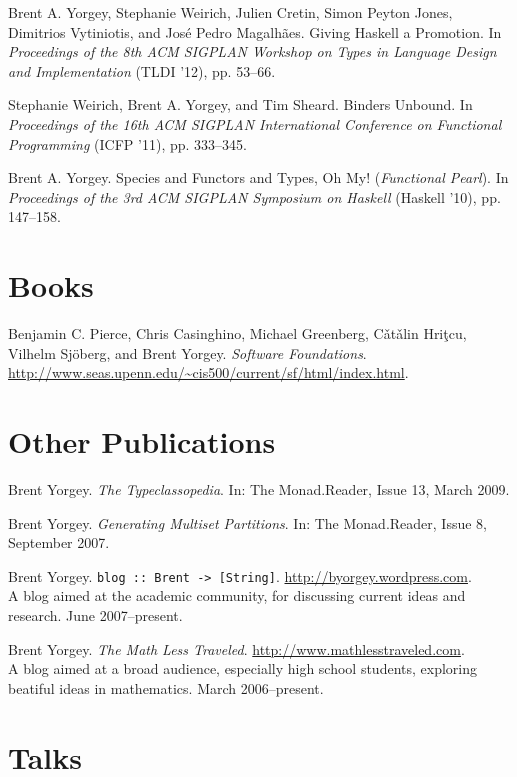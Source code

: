 \documentclass{article}
\newcommand{\cvitem}{\par\hangpara{2em}{1}}
\begin{document}
\cvitem Brent A. Yorgey, Stephanie Weirich, Julien Cretin, Simon
Peyton Jones, Dimitrios Vytiniotis, and Jos\'e Pedro
Magalh\~aes. Giving Haskell a Promotion. In \emph{Proceedings of the
  8th ACM SIGPLAN Workshop on Types in Language Design and
  Implementation} (TLDI '12), pp. 53--66.

\cvitem Stephanie Weirich, Brent A. Yorgey, and Tim Sheard. Binders
  Unbound. In \emph{Proceedings of the 16th ACM SIGPLAN International
    Conference on Functional Programming} (ICFP '11), pp. 333--345.

\cvitem Brent A. Yorgey. Species and Functors and Types, Oh
  My! (\emph{Functional Pearl}). In \emph{Proceedings of the 3rd ACM SIGPLAN
  Symposium on Haskell} (Haskell '10), pp. 147--158.

\section*{Books}
\cvitem Benjamin C. Pierce, Chris Casinghino, Michael Greenberg,
C{\v a}t{\v a}lin Hri{\c t}cu, Vilhelm Sj\"oberg, and Brent Yorgey. \emph{Software
  Foundations}. \url{http://www.seas.upenn.edu/~cis500/current/sf/html/index.html}.

\section*{Other Publications}
\cvitem Brent Yorgey. \emph{The Typeclassopedia}. In: The
Monad.Reader, Issue 13, March 2009.

\cvitem Brent Yorgey. \emph{Generating Multiset Partitions}.  In: The
Monad.Reader, Issue 8, September 2007.

\cvitem Brent Yorgey. \texttt{blog :: Brent ->
  [String]}. \url{http://byorgey.wordpress.com}.  \\
A blog aimed at the academic community, for discussing current ideas
and research.  June 2007--present.

\cvitem Brent Yorgey. \emph{The Math Less
  Traveled}. \url{http://www.mathlesstraveled.com}. \\
A blog aimed at a broad audience, especially high school students,
exploring beatiful ideas in mathematics.  March 2006--present.

\section*{Talks}
\end{document}
